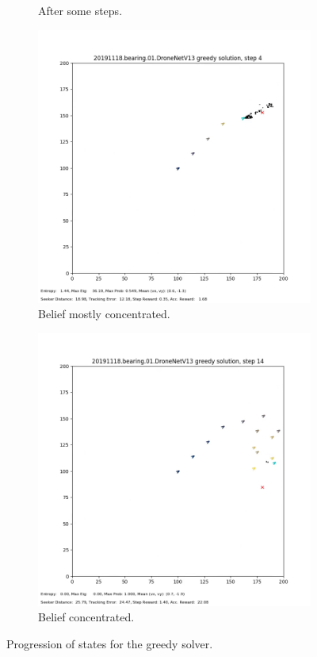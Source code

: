 \documentclass[10pt,twocolumn,letterpaper]{article}
\begin{document}
\begin{figure}[h!]
\begin{subfigure}[b]{0.48\linewidth}
    \caption{After some steps.}
  \end{subfigure}
  \begin{subfigure}[b]{0.48\linewidth}
    \includegraphics[width=\linewidth]{images/third.png}
    \caption{Belief mostly concentrated.}
  \end{subfigure}
  \begin{subfigure}[b]{0.48\linewidth}
    \includegraphics[width=\linewidth]{images/fourth.png}
    \caption{Belief concentrated.}
  \end{subfigure}
  \caption{Progression of states for the greedy solver.}
  \label{fig:greedy}
\end{figure}
\end{document}
